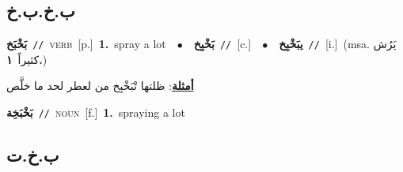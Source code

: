 \documentclass[10pt,a4paper,twoside]{article} %
\begin{document}
\begin{multicols}{2}
\vspace{-3mm}
\subsection*{\color{blue}\foreignlanguage{arabic}{ب.خ.ب.خ}\color{blue}{}} 

{\setlength\topsep{0pt}\textbf{\foreignlanguage{arabic}{بَخْبَخ}}\ {\color{gray}\texttt{//}\color{black}}\ \textsc{verb}\ [p.]\ \textbf{1.}~spray a lot\ \ $\bullet$\ \ \setlength\topsep{0pt}\textbf{\foreignlanguage{arabic}{بَخْبِخ}}\ {\color{gray}\texttt{//}\color{black}}\ [c.]\ \ $\bullet$\ \ \setlength\topsep{0pt}\textbf{\foreignlanguage{arabic}{يبَخْبِخ}}\ {\color{gray}\texttt{//}\color{black}}\ [i.]\ \color{gray}(msa. \foreignlanguage{arabic}{يَرُش كثيراً}~\foreignlanguage{arabic}{\textbf{١.}})\color{black}\  \begin{flushright}\color{gray}\foreignlanguage{arabic}{\textbf{\underline{\foreignlanguage{arabic}{أمثلة}}}: ظلتها تْبَخْبِخ من لعطر لحد ما خلَّص}\end{flushright}\color{black}} \vspace{2mm}

{\setlength\topsep{0pt}\textbf{\foreignlanguage{arabic}{بَخْبَخِة}}\ {\color{gray}\texttt{//}\color{black}}\ \textsc{noun}\ [f.]\ \textbf{1.}~spraying a lot\ } \vspace{2mm}

\vspace{-3mm}
\subsection*{\color{blue}\foreignlanguage{arabic}{ب.خ.ت}\color{blue}{}} 


\end{multicols}
\end{document}
